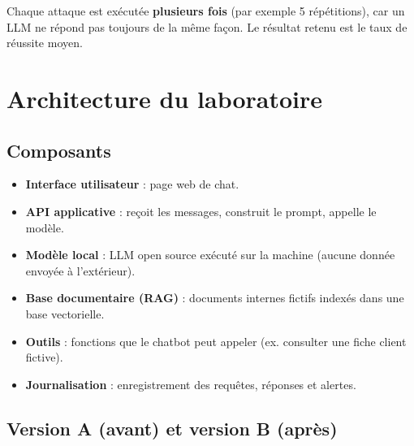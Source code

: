 \documentclass[11pt,a4paper]{article}
\begin{document}
\medskip
Chaque attaque est exécutée \textbf{plusieurs fois} (par exemple 5 répétitions), car un LLM ne répond pas toujours de la même façon. Le résultat retenu est le taux de réussite moyen.

\section{Architecture du laboratoire}

\subsection{Composants}
\begin{itemize}
  \item \textbf{Interface utilisateur} : page web de chat.
  \item \textbf{API applicative} : reçoit les messages, construit le prompt, appelle le modèle.
  \item \textbf{Modèle local} : LLM open source exécuté sur la machine (aucune donnée envoyée à l'extérieur).
  \item \textbf{Base documentaire (RAG)} : documents internes fictifs indexés dans une base vectorielle.
  \item \textbf{Outils} : fonctions que le chatbot peut appeler (ex. consulter une fiche client fictive).
  \item \textbf{Journalisation} : enregistrement des requêtes, réponses et alertes.
\end{itemize}

\subsection{Version A (avant) et version B (après)}
\end{document}
